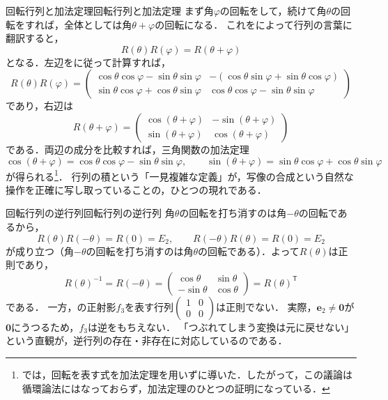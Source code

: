 \begin{example}{回転行列と加法定理}{回転行列と加法定理}
  まず角$\varphi$の回転をして，続けて角$\theta$の回転をすれば，全体としては角$\theta + \varphi$の回転になる．
  これをによって行列の言葉に翻訳すると，
  \[
    R(\theta) R(\varphi) = R(\theta + \varphi)
  \]
  となる．左辺をに従って計算すれば，
  \[
    R(\theta)R(\varphi) =
    \begin{pmatrix}
      \cos\theta\cos\varphi - \sin\theta\sin\varphi & -(\cos\theta\sin\varphi + \sin\theta\cos\varphi) \\
      \sin\theta\cos\varphi + \cos\theta\sin\varphi & \cos\theta\cos\varphi - \sin\theta\sin\varphi
    \end{pmatrix}
  \]
  であり，右辺は
  \[
    R(\theta + \varphi) =
    \begin{pmatrix}
      \cos(\theta + \varphi) & -\sin(\theta + \varphi) \\
      \sin(\theta + \varphi) & \cos(\theta + \varphi)
    \end{pmatrix}
  \]
  である．両辺の成分を比較すれば，三角関数の加法定理
  \[
    \cos(\theta + \varphi) = \cos\theta\cos\varphi - \sin\theta\sin\varphi, \qquad
    \sin(\theta + \varphi) = \sin\theta\cos\varphi + \cos\theta\sin\varphi
  \]
  が得られる\footnote{では，回転を表す式を加法定理を用いずに導いた．したがって，この議論は循環論法にはなっておらず，加法定理のひとつの証明になっている．}．
  行列の積という「一見複雑な定義」が，写像の合成という自然な操作を正確に写し取っていることの，ひとつの現れである．
\end{example}

\begin{example}{回転行列の逆行列}{回転行列の逆行列}
  角$\theta$の回転を打ち消すのは角$-\theta$の回転であるから，
  \[
    R(\theta) R(-\theta) = R(0) = E_2, \qquad
    R(-\theta) R(\theta) = R(0) = E_2
  \]
  が成り立つ（角$-\theta$の回転を打ち消すのは角$\theta$の回転である）．よって$R(\theta)$は正則であり，
  \[
    R(\theta)^{-1} = R(-\theta) = \begin{pmatrix} \cos\theta & \sin\theta \\ -\sin\theta & \cos\theta \end{pmatrix}
    = R(\theta)^\mathsf{T}
  \]
  である．
  一方，の正射影$f_3$を表す行列$\begin{pmatrix} 1 & 0 \\ 0 & 0 \end{pmatrix}$は正則でない．
  実際，$\bm{e}_2 \ne \bm{0}$が$\bm{0}$にうつるため，$f_3$は逆をもちえない．
  「つぶれてしまう変換は元に戻せない」という直観が，逆行列の存在・非存在に対応しているのである．
\end{example}

